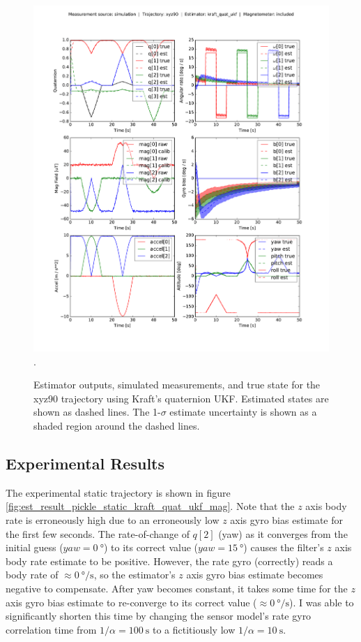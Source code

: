 \documentclass[conference]{IEEEtran}
\begin{document}
\begin{figure}[!t]
  \centering
  \includegraphics[width=7.5in]{figures/est_result_sim_xyz90_kraft_quat_ukf_mag.pdf}
  \DeclareGraphicsExtensions.
  \caption{Estimator outputs, simulated measurements, and true state for the xyz90 trajectory using Kraft's quaternion UKF. Estimated states are shown as dashed lines. The 1-$\sigma$ estimate uncertainty is shown as a shaded region around the dashed lines.}
  \label{fig:est_result_sim_xyz90_kraft_quat_ukf_mag}
\end{figure}

\subsection{Experimental Results}
The experimental static trajectory is shown in figure \ref{fig:est_result_pickle_static_kraft_quat_ukf_mag}. Note that the $z$ axis body rate is erroneously high due to an erroneously low $z$ axis gyro bias estimate for the first few seconds. The rate-of-change of $q[2]$ (yaw) as it converges from the initial guess ($yaw = \SI{0}{\degree}$) to its correct value ($yaw = \SI{15}{\degree}$) causes the filter's $z$ axis body rate estimate to be positive. However, the rate gyro (correctly) reads a body rate of $\approx \SI{0}{\degree\per\second}$, so the estimator's $z$ axis gyro bias estimate becomes negative to compensate. After yaw becomes constant, it takes some time for the $z$ axis gyro bias estimate to re-converge to its correct value ($\approx \SI{0}{\degree\per\second}$). I was able to significantly shorten this time by changing the sensor model's rate gyro correlation time from $1/\alpha = \SI{100}{\second}$ to a fictitiously low $1/\alpha = \SI{10}{\second}$.\\
\end{document}
